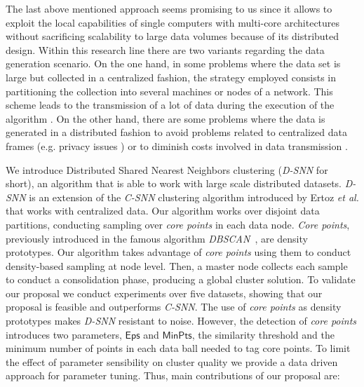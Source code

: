 \documentclass[smallextended]{svjour3}       %
\begin{document}
The last above mentioned approach seems promising to us since it allows to exploit the local capabilities of single computers with multi-core architectures without sacrificing scalability to large data volumes because of its distributed design. Within this research line there are two variants regarding the data generation scenario. On the one hand, in some problems where the data set is large but collected in a centralized fashion, the strategy employed consists in partitioning the collection into several machines or nodes of a network. This scheme leads to the transmission of a lot of data during the execution of the algorithm \cite{N15}. On the other hand, there are some problems where the data is generated in a distributed fashion to avoid problems related to centralized data frames (e.g. privacy issues \cite{JW05}) or to diminish costs involved in data transmission \cite{LHLX12}. %

We introduce Distributed Shared Nearest Neighbors clustering (\textit{D-SNN} for short), an algorithm that is able to work with large scale distributed datasets.  
\textit{D-SNN} is an extension of the \textit{C-SNN} clustering algorithm introduced by Ertoz \textit{et al.} \cite{ESK03} that works with centralized data. 
Our algorithm works over disjoint data partitions, conducting sampling over \textit{core points} in each data node. \textit{Core points}, previously introduced in the famous algorithm \textit{DBSCAN}~\cite{E96}, are density prototypes. Our algorithm takes advantage of \textit{core points} using them to conduct density-based sampling at node level. Then, a master node collects each sample to conduct a consolidation phase, producing a global cluster solution. To validate our proposal we conduct experiments over five datasets, showing that our proposal is feasible and outperforms \textit{C-SNN}. The use of \textit{core points} as density prototypes makes \textit{D-SNN} resistant to noise. However, the detection of \textit{core points} introduces two parameters, $\mathsf{Eps}$ and $\mathsf{MinPts}$, the similarity threshold and the minimum number of points in each data ball needed to tag core points. To limit the effect of parameter sensibility on cluster quality we provide a data driven approach for parameter tuning. Thus, main contributions of our proposal are:
\end{document}

